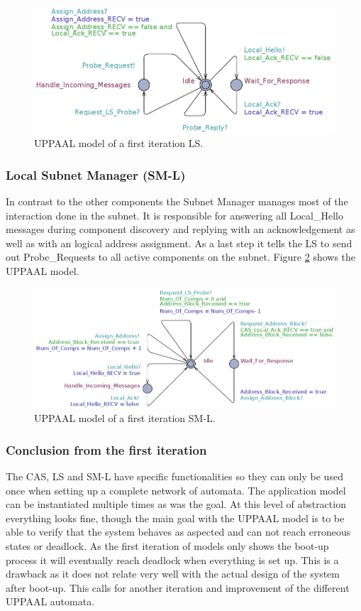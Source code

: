 \begin{figure}[h]
    \centering
    \includegraphics[width=\textwidth]{figures/iteration1_ls}
    \caption{UPPAAL model of a first iteration LS.}
    \label{fig:iteration1_ls}
\end{figure}

\subsubsection{Local Subnet Manager (SM-L)}
In contrast to the other components the Subnet Manager manages most of the
interaction done in the subnet. It is responsible for answering all Local\_Hello
messages during component discovery and replying with an acknowledgement as
well as with an logical address assignment. As a last step it tells the LS to
send out Probe\_Requests to all active components on the subnet. Figure
\ref{fig:iteration1_sm_l} shows the UPPAAL model.

\begin{figure}[h]
    \centering
    \includegraphics[width=\textwidth]{figures/iteration1_sm_l}
    \caption{UPPAAL model of a first iteration SM-L.}
    \label{fig:iteration1_sm_l}
\end{figure}


\subsubsection{Conclusion from the first iteration}
The CAS, LS and SM-L have specific functionalities so they can only be used
once when setting up a complete network of automata. The application model can
be instantiated multiple times as was the goal. At this level of abstraction
everything looks fine, though the main goal with the UPPAAL model is to be able
to verify that the system behaves as aspected and can not reach erroneous
states or deadlock. As the first iteration of models only shows the boot-up
process it will eventually reach deadlock when everything is set up. This is a
drawback as it does not relate very well with the actual design of the system
after boot-up. This calls for another iteration and improvement of the
different UPPAAL automata.

